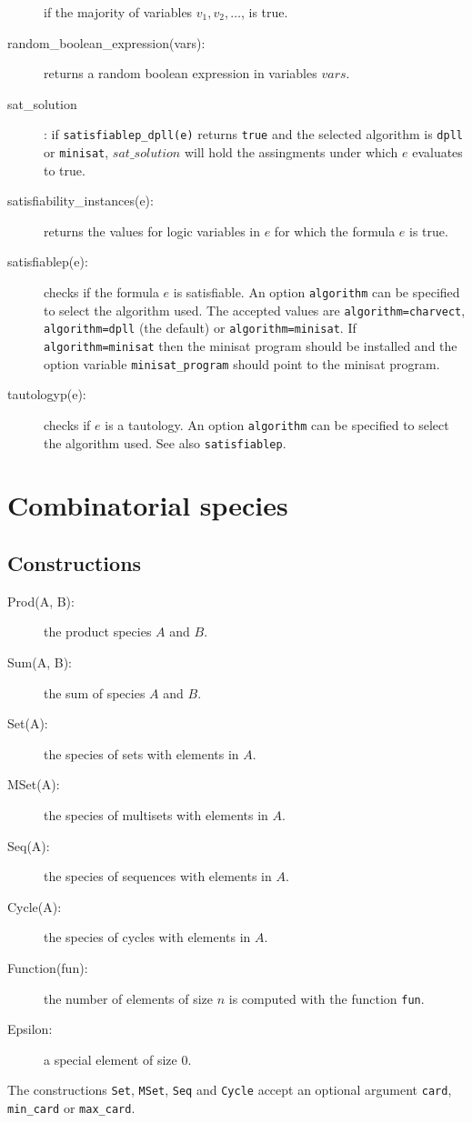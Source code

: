 \documentclass[11pt]{article}
\begin{document}
\begin{description}
    if the majority of variables $v_1, v_2, \ldots$, is true.
  \item[random\_boolean\_expression(vars):] returns a random boolean
    expression in variables $vars$.
  \item[sat\_solution]: if \verb|satisfiablep_dpll(e)| returns
    \texttt{true} and the selected algorithm is \texttt{dpll} or
    \texttt{minisat}, $sat\_solution$ will hold the assingments under
    which $e$ evaluates to true.
  \item[satisfiability\_instances(e):] returns the values for logic
    variables in $e$ for which the formula $e$ is true.
  \item[satisfiablep(e):] checks if the formula $e$ is satisfiable. An
    option \texttt{algorithm} can be specified to select the algorithm
    used. The accepted values are \texttt{algorithm=charvect},
    \texttt{algorithm=dpll} (the default) or
    \texttt{algorithm=minisat}. If \texttt{algorithm=minisat} then the
    minisat program should be installed and the option variable
    \texttt{minisat\_program} should point to the minisat program.
  \item[tautologyp(e):] checks if $e$ is a tautology. An option
    \texttt{algorithm} can be specified to select the algorithm
    used. See also \texttt{satisfiablep}.
\end{description}

\section{Combinatorial species}

\subsection{Constructions}
\begin{description}
  \item[Prod(A, B):] the product species $A$ and $B$.
  \item[Sum(A, B):] the sum of species $A$ and $B$.
  \item[Set(A):] the species of sets with elements in $A$.
  \item[MSet(A):] the species of multisets with elements in $A$.
  \item[Seq(A):] the species of sequences with elements in $A$.
  \item[Cycle(A):] the species of cycles with elements in $A$.
  \item[Function(fun):] the number of elements of size $n$ is computed
    with the function \texttt{fun}.
  \item[Epsilon:] a special element of size 0.
\end{description}
%
The constructions \texttt{Set}, \texttt{MSet}, \texttt{Seq} and
\texttt{Cycle} accept an optional argument \texttt{card},
\texttt{min\_card} or \texttt{max\_card}.
\end{document}
